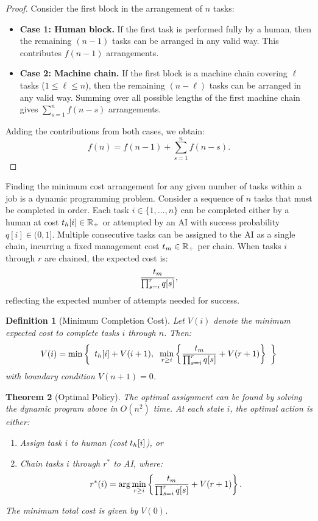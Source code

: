 \documentclass{article}
\theoremstyle{plain}
\theoremstyle{plain}
\newtheorem{theorem}{Theorem}
\newtheorem{definition}[theorem]{Definition}
\begin{document}
\begin{proof}
Consider the first block in the arrangement of \(n\) tasks:
\begin{itemize}
    \item \textbf{Case 1: Human block.} If the first task is performed fully by a human, then the remaining \((n-1)\) tasks can be arranged in any valid way. This contributes \(f(n-1)\) arrangements.
    \item \textbf{Case 2: Machine chain.} If the first block is a machine chain covering \(\ell\) tasks (\(1 \leq \ell \leq n\)), then the remaining \((n-\ell)\) tasks can be arranged in any valid way. Summing over all possible lengths of the first machine chain gives \(\sum_{s=1}^{n} f(n-s)\) arrangements.
\end{itemize}
Adding the contributions from both cases, we obtain:
\[
f(n) = f(n-1) + \sum_{s=1}^{n} f(n-s).
\]
\end{proof}

Finding the minimum cost arrangement for any given number of tasks within a job is a dynamic programming problem.
Consider a sequence of \(n\) tasks that must be completed in order. 
Each task \(i \in \{1,\ldots,n\}\) can be completed either by a human at cost \(t_{h}[i] \in \mathbb{R}_+\) or attempted by an AI with success probability \(q[i] \in (0,1]\).
Multiple consecutive tasks can be assigned to the AI as a single chain, incurring a fixed management cost \(t_{m} \in \mathbb{R}_+\) per chain. 
When tasks \(i\) through \(r\) are chained, the expected cost is:
\[
\frac{t_{m}}{\prod_{s=i}^r q[s]},
\]
reflecting the expected number of attempts needed for success.

\begin{definition}[Minimum Completion Cost]
Let \(V(i)\) denote the minimum expected cost to complete tasks \(i\) through \(n\). Then:
\begin{equation}
V(i) = \min\left\{
\begin{array}{l}
t_{h}[i] + V(i+1), 
\;\;
\displaystyle\min_{r \geq i} \left\{\frac{t_{m}}{\prod_{s=i}^r q[s]} + V(r+1)\right\}
\end{array}
\right\}
\end{equation}
with boundary condition \(V(n+1) = 0\).
\end{definition}

\begin{theorem}[Optimal Policy]
The optimal assignment can be found by solving the dynamic program above in \(O(n^2)\) time. At each state \(i\), the optimal action is either:
\begin{enumerate}
    \item Assign task \(i\) to human (cost \(t_{h}[i]\)), or
    \item Chain tasks \(i\) through \(r^*\) to AI, where:
    \begin{equation}
        r^*(i) = \arg\min_{r \geq i} \left\{\frac{t_{m}}{\prod_{s=i}^r q[s]} + V(r+1)\right\}.
    \end{equation}
\end{enumerate}
The minimum total cost is given by \(V(0)\).
\end{theorem}
\end{document}
